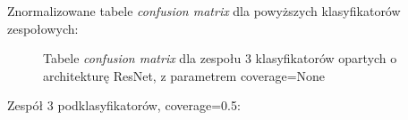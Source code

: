 \documentclass[polish,12pt]{aghthesis}
\begin{document}
\noindent Znormalizowane tabele \textit{confusion matrix} dla powyższych klasyfikatorów zespołowych:
\begin{figure}[H]%
    \begin{adjustbox}{minipage=1.0\paperwidth, pagecenter}
    \centering
    \qquad
    \end{adjustbox}
    \label{fig:resnet-ens-3-None-matrices}
    \caption{Tabele \textit{confusion matrix} dla zespołu 3 klasyfikatorów opartych o architekturę ResNet, z parametrem coverage=None}
\end{figure}
\newpage
\noindent Zespół 3 podklasyfikatorów, coverage=0.5:
\end{document}
